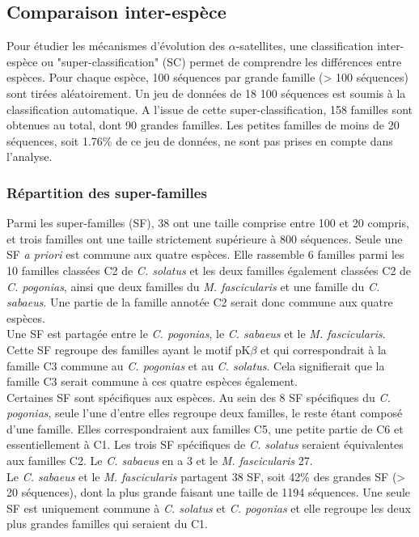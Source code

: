 \documentclass[12pt,a4paper]{article}
\begin{document}
	
	\subsection{Comparaison inter-espèce}
	Pour étudier les mécanismes d'évolution des $\alpha$-satellites, une classification inter-espèce ou "super-classification" (SC) permet de comprendre les différences entre espèces. Pour chaque espèce, 100 séquences par grande famille (> 100 séquences) sont tirées aléatoirement. Un jeu de données de 18 100 séquences est soumis à la classification automatique. A l'issue de cette super-classification, 158 familles sont obtenues au total, dont 90 grandes familles. Les petites familles de moins de 20 séquences, soit 1.76\% de ce jeu de données, ne sont pas prises en compte dans l'analyse.\\
	\subsubsection{Répartition des super-familles}
	Parmi les super-familles (SF), 38 ont une taille comprise entre 100 et 20 compris, et trois familles ont une taille strictement supérieure à 800 séquences. Seule une SF \textit{a priori} est commune aux quatre espèces. Elle rassemble 6 familles parmi les 10 familles classées C2 de \textit{C. solatus} et les deux familles également classées C2 de \textit{C. pogonias}, ainsi que deux familles du \textit{M. fascicularis} et une famille du \textit{C. sabaeus}. Une partie de la famille annotée C2 serait donc commune aux quatre espèces.\\
	Une SF est partagée entre le \textit{C. pogonias}, le \textit{C. sabaeus} et le \textit{M. fascicularis}. Cette SF regroupe des familles ayant le motif pK$\beta$ et qui correspondrait à la famille C3 commune au \textit{C. pogonias} et au \textit{C. solatus}. Cela signifierait que la famille C3 serait commune à ces quatre espèces également.\\
	Certaines SF sont spécifiques aux espèces. Au sein des 8 SF spécifiques du \textit{C. pogonias}, seule l'une d'entre elles regroupe deux familles, le reste étant composé d'une famille. Elles correspondraient aux familles C5, une petite partie de C6 et essentiellement à C1. Les trois SF spécifiques de \textit{C. solatus} seraient équivalentes aux familles C2. Le \textit{C. sabaeus} en a 3 et le \textit{M. fascicularis} 27.\\
	Le \textit{C. sabaeus} et le \textit{M. fascicularis} partagent 38 SF, soit 42\% des grandes SF (> 20 séquences), dont la plus grande faisant une taille de 1194 séquences. Une seule SF est uniquement commune à \textit{C. solatus} et \textit{C. pogonias} et elle regroupe les deux plus grandes familles qui seraient du C1.
\end{document}
